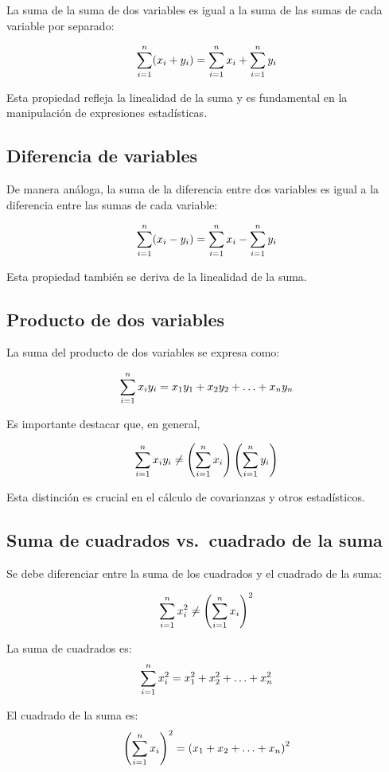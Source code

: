 \documentclass[
  spanish,
  letterpaper,
]{book}
\begin{document}
La suma de la suma de dos variables es igual a la suma de las sumas de
cada variable por separado:

\[{\huge \sum_{i=1}^{n} (x_i + y_i) = \sum_{i=1}^{n} x_i + \sum_{i=1}^{n} y_i}\]

Esta propiedad refleja la linealidad de la suma y es fundamental en la
manipulación de expresiones estadísticas.

\subsection{Diferencia de variables}\label{diferencia-de-variables}

De manera análoga, la suma de la diferencia entre dos variables es igual
a la diferencia entre las sumas de cada variable:

\[{\huge \sum_{i=1}^{n} (x_i - y_i) = \sum_{i=1}^{n} x_i - \sum_{i=1}^{n} y_i}\]

Esta propiedad también se deriva de la linealidad de la suma.

\subsection{Producto de dos variables}\label{producto-de-dos-variables}

La suma del producto de dos variables se expresa como:

\[{\huge \sum_{i=1}^{n} x_i y_i = x_1 y_1 + x_2 y_2 + \ldots + x_n y_n}\]

Es importante destacar que, en general,

\[{\huge \sum_{i=1}^{n} x_i y_i \neq \left(\sum_{i=1}^{n} x_i\right) \left(\sum_{i=1}^{n} y_i\right)}\]

Esta distinción es crucial en el cálculo de covarianzas y otros
estadísticos.

\subsection{Suma de cuadrados vs.~cuadrado de la
suma}\label{suma-de-cuadrados-vs.-cuadrado-de-la-suma}

Se debe diferenciar entre la suma de los cuadrados y el cuadrado de la
suma:

\[{\huge \sum_{i=1}^{n} x_i^2 \neq \left(\sum_{i=1}^{n} x_i\right)^2}\]

La suma de cuadrados es:
\[{\huge \sum_{i=1}^{n} x_i^2 = x_1^2 + x_2^2 + \ldots + x_n^2}\]

El cuadrado de la suma es:
\[{\huge \left(\sum_{i=1}^{n} x_i\right)^2 = \left(x_1 + x_2 + \ldots + x_n\right)^2}\]
\end{document}

